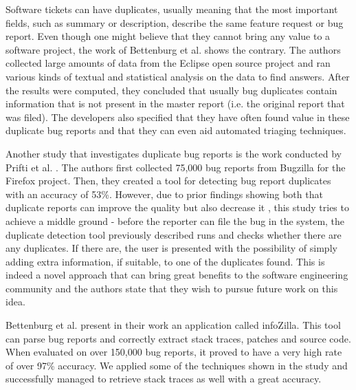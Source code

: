 \documentclass{mpaper}
\begin{document}
Software tickets can have duplicates, usually meaning that the most important fields, such 
as summary or description, describe the same feature request or bug report. Even though 
one might believe that they cannot bring any value to a software project, the work of 
Bettenburg et al. \cite{bettenburg2008duplicate} shows the contrary.
The authors collected large amounts of data from the Eclipse open source project and ran
various kinds of textual and statistical analysis on the data to find answers.
After the results were computed, they concluded that usually bug duplicates contain 
information that is not present in the master report (i.e. the original report that was 
filed). The developers also specified that they have often found value in these 
duplicate bug reports and that they can even aid automated triaging techniques. 

Another study that investigates duplicate bug reports is the work conducted by Prifti et al. \cite{prifti2011detecting}. 
The authors first collected 75,000 bug reports from Bugzilla for the Firefox project. Then, they created a tool 
for detecting bug report duplicates with an accuracy of 53\%. However, due to prior 
findings showing both that duplicate reports can improve the quality \cite{bettenburg2008duplicate}
but also decrease it \cite{cavalcanti2013bug}, this study tries to achieve a middle ground - 
before the reporter can file the bug in the system, the duplicate detection tool previously 
described runs and checks whether there are any duplicates. If there are, the user is presented 
with the possibility of simply adding extra information, if suitable, to one of the duplicates 
found. This is indeed a novel approach that can bring great benefits to the software engineering 
community and the authors state that they wish to pursue future work on this idea.

Bettenburg et al. \cite{bettenburg2012using} present in their work an application
called infoZilla. This tool can
parse bug reports and correctly extract stack traces, patches and source code. 
When evaluated on over 150,000 bug reports, it proved to have a very high rate of over 97\% accuracy.
We applied some of the techniques shown in the study and successfully managed to 
retrieve stack traces as well with a great accuracy.
\end{document}
